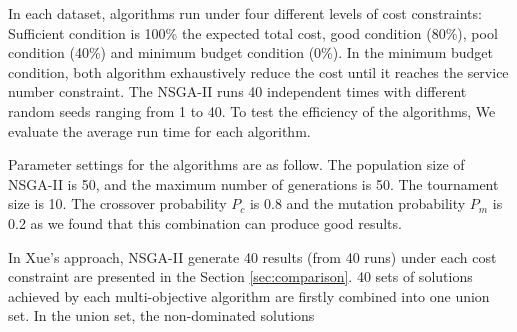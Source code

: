\documentclass{llncs}
\begin{document}
In each dataset, algorithms run under four different levels of cost constraints: Sufficient condition is 100\% the expected total cost, 
good condition (80\%), pool condition (40\%) and minimum budget condition (0\%). In the minimum budget condition, 
both algorithm exhaustively reduce the cost until it reaches the service number constraint. The NSGA-II runs 40 independent times with different random 
seeds ranging from 1 to 40. To test the efficiency of the algorithms, We evaluate the average run time for each algorithm. 


Parameter settings for the algorithms are as follow. The population size of NSGA-II is 50, and the maximum number of 
generations is 50. The tournament size is 10. The crossover probability $P_{c}$ is 0.8 and the mutation probability $P_{m}$ is 0.2 as we found that this combination can produce good results.

In Xue's approach, NSGA-II generate 40 results (from 40 runs) under each cost constraint are presented in the Section \ref{sec:comparison}. 40 sets of solutions 
achieved by each multi-objective algorithm are firstly combined into one union set. In the union set, the non-dominated solutions 
\end{document}
